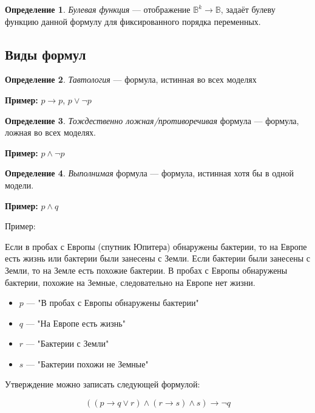 \documentclass[12pt]{article}
\newenvironment{quo}{
  \begin{framed}
    \begin{minipage}{0.97\textwidth}
      \setlength{\parskip}{4mm}
    }{
    \end{minipage}
\end{framed}}
\let\im\rightarrow
\let\n\neg
\newcommand{\task}[2]{
  \begin{quo}
    {\bf #1} #2
\end{quo}}
\theoremstyle{definition}
\newtheorem{definition}{Определение}[section]
\theoremstyle{plain}
\theoremstyle{remark}
\begin{document}
\begin{definition}
  \textit{Булевая функция} --- отображение $\mathbb{B}^k \to
  \mathbb{B}$, задаёт булеву функцию данной формулу для фиксированного
  порядка переменных.
\end{definition}

\subsection{Виды формул}

\begin{definition}
  \textit{Тавтология} --- формула, истинная во всех моделях

  \textbf{Пример:} $p \im p$, $p \lor \n p$
\end{definition}

\begin{definition}
  \textit{Тождественно ложная/противоречивая} формула --- формула,
  ложная во всех моделях.

  \textbf{Пример:} $p \land \n p$
\end{definition}

\begin{definition}
  \textit{Выполнимая} формула --- формула, истинная хотя бы в одной модели.

  \textbf{Пример:} $p \land q$\\
\end{definition}

Пример:

\task{}{Если в пробах с Европы (спутник Юпитера) обнаружены бактерии,
  то на Европе есть жизнь или бактерии были занесены с Земли. Если
  бактерии были занесены с Земли, то на Земле есть похожие бактерии. В
  пробах с Европы обнаружены бактерии, похожие на Земные, следовательно
на Европе нет жизни.}
\begin{itemize}
  \item $p$ --- "В пробах с Европы обнаружены бактерии"

  \item $q$ --- "На Европе есть жизнь"

  \item $r$ --- "Бактерии с Земли"

  \item $s$ --- "Бактерии похожи не Земные"
\end{itemize}

Утверждение можно записать следующей формулой:

\[
  \left((p \im q \lor r) \land (r \im s) \land s\right) \im \n q
\]
\end{document}
